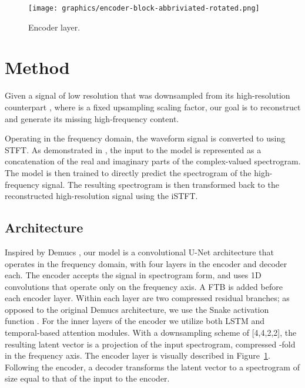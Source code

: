 

\begin{figure}[t!]
    \centering
    \texttt{[image: graphics/encoder-block-abbriviated-rotated.png]}
    \caption{Encoder layer.}
    \label{fig:encoder-block}
\end{figure}

\vspace{-0.2cm}
\section{Method}
\label{sec:model}





Given a signal of low resolution  that was downsampled from its high-resolution counterpart , where  is a fixed upsampling scaling factor, our goal is to reconstruct  and generate its missing high-frequency content.

Operating in the frequency domain, the waveform signal  is converted to  using \ac{STFT}. As demonstrated in \cite{choi}, the input to the model is represented as a concatenation of the real and imaginary parts of the complex-valued spectrogram. The model is then trained to directly predict the spectrogram of the high-frequency signal. The resulting spectrogram  is then transformed back to the reconstructed high-resolution signal  using the \ac{iSTFT}.
\vspace{-0.2cm}
\subsection{Architecture}

Inspired by Demucs \cite{hdemucs}, our model is a convolutional U-Net architecture that operates in the frequency domain, with four layers in the encoder and decoder each. 
The encoder accepts the signal in spectrogram form, and uses 1D convolutions that operate only on the frequency axis. A \ac{FTB} \cite{phasen} is added before each encoder layer. Within each layer are two compressed residual branches; as opposed to the original Demucs architecture, we use the Snake activation function \cite{snake}. For the inner layers of the encoder we utilize both LSTM and temporal-based attention modules. With a downsampling scheme of [4,4,2,2], the resulting latent vector is a projection of the input spectrogram, compressed -fold in the frequency axis. The encoder layer is visually described in Figure~\ref{fig:encoder-block}. Following the encoder, a decoder transforms the latent vector to a spectrogram of size equal to that of the input to the encoder.

